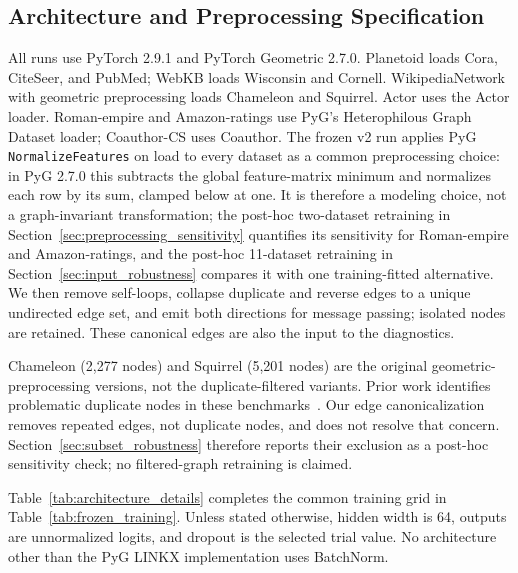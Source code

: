 \subsection{Architecture and Preprocessing Specification}

All runs use PyTorch 2.9.1 and PyTorch Geometric 2.7.0. Planetoid loads Cora, CiteSeer, and PubMed; WebKB loads Wisconsin and Cornell. WikipediaNetwork with geometric preprocessing loads Chameleon and Squirrel. Actor uses the Actor loader. Roman-empire and Amazon-ratings use PyG's Heterophilous Graph Dataset loader; Coauthor-CS uses Coauthor. The frozen v2 run applies PyG \texttt{NormalizeFeatures} on load to every dataset as a common preprocessing choice: in PyG 2.7.0 this subtracts the global feature-matrix minimum and normalizes each row by its sum, clamped below at one. It is therefore a modeling choice, not a graph-invariant transformation; the post-hoc two-dataset retraining in Section~\ref{sec:preprocessing_sensitivity} quantifies its sensitivity for Roman-empire and Amazon-ratings, and the post-hoc 11-dataset retraining in Section~\ref{sec:input_robustness} compares it with one training-fitted alternative. We then remove self-loops, collapse duplicate and reverse edges to a unique undirected edge set, and emit both directions for message passing; isolated nodes are retained. These canonical edges are also the input to the diagnostics.

Chameleon (2,277 nodes) and Squirrel (5,201 nodes) are the original geometric-preprocessing versions, not the duplicate-filtered variants. Prior work identifies problematic duplicate nodes in these benchmarks~\citep{platonov2023heterophilous}. Our edge canonicalization removes repeated edges, not duplicate nodes, and does not resolve that concern. Section~\ref{sec:subset_robustness} therefore reports their exclusion as a post-hoc sensitivity check; no filtered-graph retraining is claimed.

Table~\ref{tab:architecture_details} completes the common training grid in Table~\ref{tab:frozen_training}. Unless stated otherwise, hidden width is 64, outputs are unnormalized logits, and dropout is the selected trial value. No architecture other than the PyG LINKX implementation uses BatchNorm.

